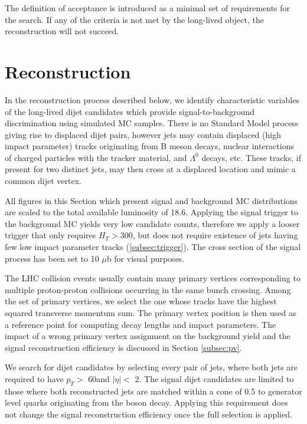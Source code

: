 The definition of acceptance is introduced as a minimal set of requirements for the search.
If any of the criteria is not met by the long-lived object, the reconstruction will not succeed.

\section{Reconstruction}

In the reconstruction process described below, we identify characteristic variables
of the long-lived dijet candidates which provide
signal-to-background discrimination using simulated MC samples.    
There is no Standard Model process giving rise to displaced dijet pairs,
however jets may contain displaced (high impact parameter) tracks originating from B meson decays, nuclear
interactions of charged particles with the tracker material, \Kshort and $\Lambda^0$ decays, etc. These tracks, if 
present for two distinct jets,
may then cross at a displaced location and mimic a common dijet vertex. 

All figures in this Section which present signal and background MC distributions 
are scaled to the total available luminosity
of 18.6\fbinv. Applying the signal trigger to the background MC yields very low candidate counts, therefore
we apply a looser trigger that only requires $H_T>$300\GeV, but does not require existence of jets
having few low impact parameter tracks (\ref{subsec:trigger}).  
 The cross section of the signal process has been set to 10 $\mu$b for visual purposes.   

The LHC collision events usually contain many primary vertices corresponding to multiple proton-proton collisions occurring 
in the same bunch crossing.
Among the set of primary vertices, we select the one whose tracks have the highest squared transverse momentum sum.
 The primary vertex position is
then used as a reference point for computing decay lengths and impact parameters. The impact of a wrong
primary vertex assignment on the background yield and the signal reconstruction efficiency is discussed
in Section \ref{subsec:pv}. 


We search for dijet candidates by selecting every pair of jets, where both jets are required to 
have $p_T>$ 60\GeV and $|\eta|<$ 2. 
The signal dijet candidates are limited
to those where both reconstructed jets are matched within a cone of 0.5 to generator level quarks originating
 from the \X boson decay. Applying this requirement does not change the signal reconstruction efficiency
once the full selection is applied. 

